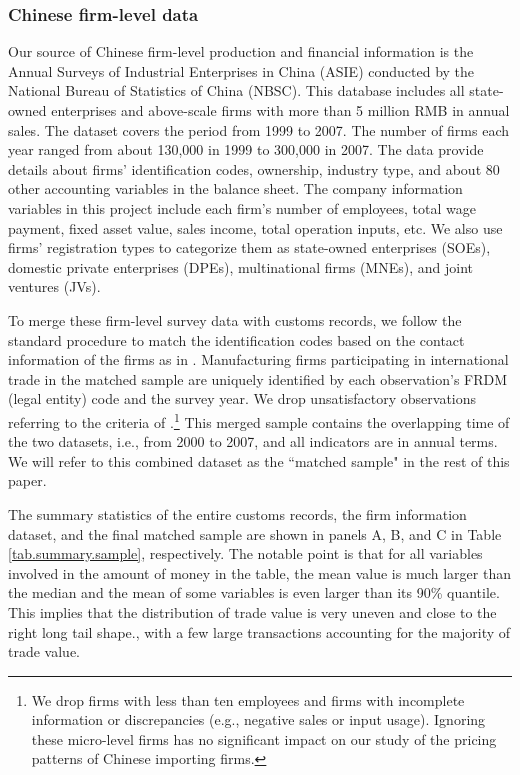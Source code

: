 \subsubsection{Chinese firm-level data} \label{Data-CIE}

Our source of Chinese firm-level production and financial information is the Annual Surveys of Industrial Enterprises in China (ASIE) conducted by the National Bureau of Statistics of China (NBSC). This database includes all state-owned enterprises and above-scale firms with more than 5 million RMB in annual sales. The dataset covers the period from 1999 to 2007. The number of firms each year ranged from about 130,000 in 1999 to 300,000 in 2007. The data provide details about firms’ identification codes, ownership, industry type, and about 80 other accounting variables in the balance sheet. The company information variables in this project include each firm's number of employees, total wage payment, fixed asset value, sales income, total operation inputs, etc. We also use firms’ registration types to categorize them as state-owned enterprises (SOEs), domestic private enterprises (DPEs), multinational firms (MNEs), and joint ventures (JVs).

To merge these firm-level survey data with customs records, we follow the standard procedure to match the identification codes based on the contact information of the firms as in \cite{fan-li-yeaple2015}. Manufacturing firms participating in international trade in the matched sample are uniquely identified by each observation's FRDM (legal entity) code and the survey year. We drop unsatisfactory observations referring to the criteria of \cite{bkl2021}.\footnote{We drop firms with less than ten employees and firms with incomplete information or discrepancies (e.g., negative sales or input usage). Ignoring these micro-level firms has no significant impact on our study of the pricing patterns of Chinese importing firms.} This merged sample contains the overlapping time of the two datasets, i.e., from 2000 to 2007, and all indicators are in annual terms. We will refer to this combined dataset as the ``matched sample" in the rest of this paper.

The summary statistics of the entire customs records, the firm information dataset, and the final matched sample are shown in panels A, B, and C in Table \ref{tab.summary.sample}, respectively. The notable point is that for all variables involved in the amount of money in the table, the mean value is much larger than the median and the mean of some variables is even larger than its 90\% quantile. This implies that the distribution of trade value is very uneven and close to the right long tail shape., with a few large transactions accounting for the majority of trade value.

